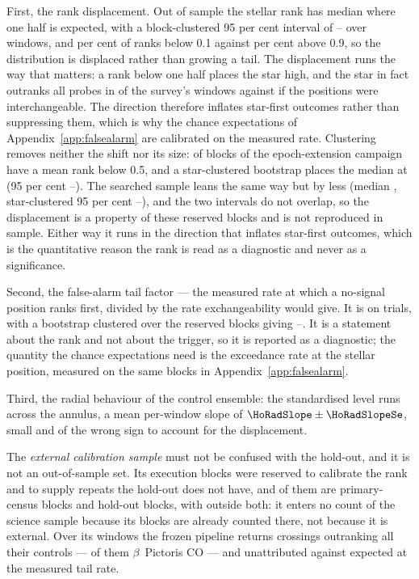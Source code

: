 First, the rank displacement. Out of sample the stellar rank has median
\HoRankMed{} where one half is expected, with a block-clustered 95 per cent
interval of \HoRankMedLo--\HoRankMedHi{} over \HoWin{} windows, and
\HOFracLoPct{} per cent of ranks below 0.1 against \HOFracHiPct{} per cent
above 0.9, so the distribution is displaced rather than growing a tail. The
displacement runs the way that matters: a rank below one half places the star
high, and the star in fact outranks all \NCtrl{} probes in \NsrFirstObs{} of
the survey's windows against \NsrFirstExp{} if the positions were
interchangeable. The direction therefore inflates star-first outcomes rather
than suppressing them, which is why the chance expectations of
Appendix~\ref{app:falsealarm} are calibrated on the measured rate.
Clustering removes neither the shift nor its size: \HOBlockBelow{} of
\HOBlockN{} blocks of the epoch-extension campaign have a mean rank below
0.5, and a star-clustered bootstrap
places the median at \HOBootMed{} (95 per cent \HOBootLo--\HOBootHi). The
searched sample leans the same way but by less (median \SurvMedP,
star-clustered 95 per cent \SurvBootLo--\SurvBootHi), and the two
intervals do not overlap, so the displacement is a property of these
reserved blocks and is not reproduced in sample. Either way it runs in the
direction that inflates star-first outcomes, which is the quantitative
reason the rank is read as a diagnostic and never as a significance.

Second, the false-alarm tail factor --- the measured rate at which a
no-signal position ranks first, divided by the rate exchangeability would
give. It is \HoTailFactor{} on \HoPseudoTrials{} trials, with a bootstrap
clustered over the \HoTailBlocks{} reserved blocks giving
\HoTailLo--\HoTailHi. It is a statement about the rank and not about the
trigger, so it is reported as a diagnostic; the quantity the chance
expectations need is the exceedance rate at the stellar position, measured
on the same blocks in Appendix~\ref{app:falsealarm}.

Third, the radial behaviour of the control ensemble: the standardised level
runs \HoRadBins{} across the annulus, a mean per-window slope of
$\HoRadSlope\pm\HoRadSlopeSe$, small and of the wrong sign to account for the
displacement.

The \emph{external calibration sample} must not be confused with the
hold-out, and it is not an out-of-sample set. Its \CampBlocks{} execution
blocks were reserved to calibrate the rank and to supply repeats the hold-out
does not have, and \CalNCensus{} of them are primary-census blocks and
\CalNHoldout{} hold-out blocks, with \CalNOutside{} outside both: it enters no
count of the science sample because its blocks are already counted there, not
because it is external. Over its \CampWindows{} windows the frozen pipeline
returns \CampStageOne{} crossings outranking all their controls ---
\CampStageOneCO{} of them $\beta$~Pictoris CO --- and \CampUnattrib{}
unattributed against \CampExpUn{} expected at the measured tail rate.

